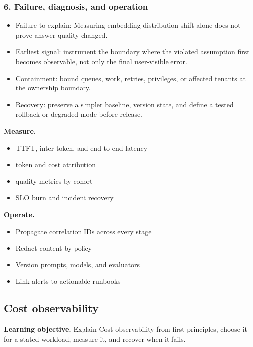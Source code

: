 \subsubsection*{6. Failure, diagnosis, and operation}
\begin{itemize}
\item Failure to explain: Measuring embedding distribution shift alone does not prove answer quality changed.
\item Earliest signal: instrument the boundary where the violated assumption first becomes observable, not only the final user-visible error.
\item Containment: bound queues, work, retries, privileges, or affected tenants at the ownership boundary.
\item Recovery: preserve a simpler baseline, version state, and define a tested rollback or degraded mode before release.
\end{itemize}
\textbf{Measure.}\begin{itemize}
\item TTFT, inter-token, and end-to-end latency
\item token and cost attribution
\item quality metrics by cohort
\item SLO burn and incident recovery
\end{itemize}
\textbf{Operate.}\begin{itemize}
\item Propagate correlation IDs across every stage
\item Redact content by policy
\item Version prompts, models, and evaluators
\item Link alerts to actionable runbooks
\end{itemize}
\subsection{Cost observability}
\textbf{Learning objective.} Explain Cost observability from first principles, choose it for a stated workload, measure it, and recover when it fails.
